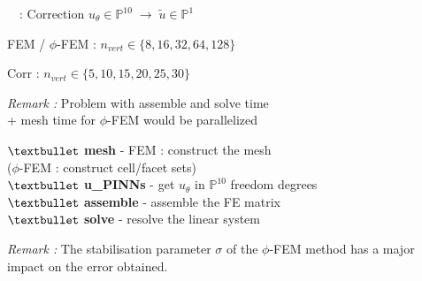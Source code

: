 \begin{frame}{\appendixname~\theappendixframenumber~: Correction}
	$u_\theta\in\mathbb{P}^{10} \; \rightarrow \; \tilde{u}\in\mathbb{P}^1$
	
	\begin{minipage}{0.5\linewidth}
		\centering
		
		\raggedright
		FEM / $\phi$-FEM : $n_{vert}\in\{8,16,32,64,128\}$
		
		Corr : $n_{vert}\in\{5,10,15,20,25,30\}$
	\end{minipage} \quad
	\begin{minipage}{0.46\linewidth}
		\centering
		
		\tiny\raggedright
		\textit{Remark :} Problem with assemble and solve time \\
		+ mesh time for $\phi$-FEM would be parallelized
		
		\small
		$\textbullet$ \textbf{mesh} - FEM : construct the mesh \\
		($\phi$-FEM : construct cell/facet sets) \\
		$\textbullet$ \textbf{u\_PINNs} - get $u_\theta$ in $\mathbb{P}^{10}$ freedom degrees \\
		$\textbullet$ \textbf{assemble} - assemble the FE matrix \\
		$\textbullet$ \textbf{solve} - resolve the linear system
	\end{minipage}
	
	\small
	\textit{Remark :} The stabilisation parameter $\sigma$ of the $\phi$-FEM method has a major impact on the error obtained.
\end{frame}
\addtocounter{appendixframenumber}{1}
